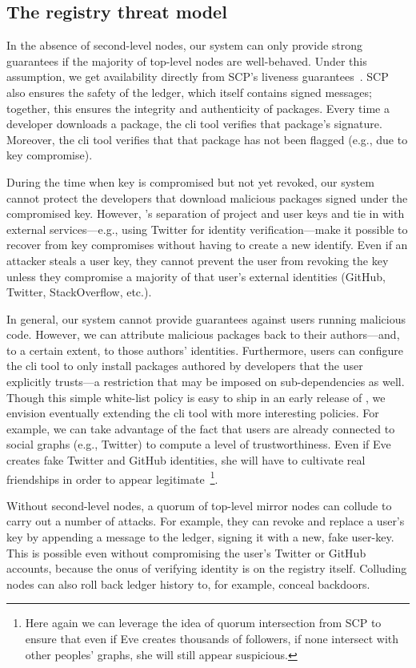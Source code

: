 \subsection{The registry threat model}
In the absence of second-level nodes, our system can only provide strong
guarantees if the majority of top-level nodes are well-behaved. Under this
assumption, we get availability directly from SCP's liveness
guarantees~\cite{stellar}. SCP also ensures the safety of the ledger, which
itself contains signed messages; together, this ensures the integrity and
authenticity of packages. Every time a developer downloads a package, the
\spam{} cli tool verifies that package's signature. Moreover, the \spam{} cli
tool verifies that that package has not been flagged (e.g., due to key
compromise). 

During the time when key is compromised but not yet revoked, our system cannot
protect the developers that download malicious packages signed under the
compromised key. However, \spam's separation of project and user keys and tie
in with external services---e.g., using Twitter for identity
verification---make it possible to recover from key compromises without having
to create a new identify. Even if an attacker steals a user key, they cannot
prevent the user from revoking the key unless they compromise a majority of
that user's external identities (GitHub, Twitter, StackOverflow, etc.). 

In general, our system cannot provide guarantees against users running
malicious code. However, we can attribute malicious packages back to their
authors---and, to a certain extent, to those authors' identities. Furthermore,
users can configure the \spam{} cli tool to only install packages authored by
developers that the user explicitly trusts---a restriction that may be imposed
on sub-dependencies as well. Though this simple white-list policy is easy to
ship in an early release of \spam, we envision eventually extending the cli
tool with more interesting policies. For example, we can take advantage of the
fact that \spam users are already connected to social graphs (e.g., Twitter) to
compute a level of trustworthiness. Even if Eve creates fake Twitter and GitHub
identities, she will have to cultivate real friendships in order to appear
legitimate~\footnote{Here again we can leverage the idea of quorum intersection
from SCP to ensure that even if Eve creates thousands of followers, if none
intersect with other peoples' graphs, she will still appear suspicious.}.

Without second-level nodes, a quorum of top-level mirror nodes can collude to
carry out a number of attacks. For example, they can revoke and replace a
user's key by appending a \replaceuserkey message to the ledger, signing it
with a new, fake user-key. This is possible even without compromising the
user's Twitter or GitHub accounts, because the onus of verifying identity is on
the registry itself. Colluding nodes can also roll back ledger history to, for
example, conceal backdoors.

